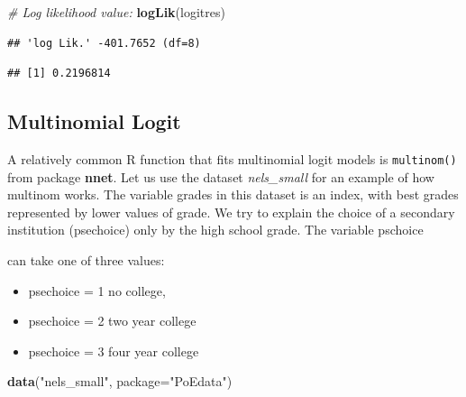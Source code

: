 \documentclass[]{book}
\newenvironment{Shaded}{\begin{snugshade}}{\end{snugshade}}
\newcommand{\CommentTok}[1]{\textcolor[rgb]{0.56,0.35,0.01}{\textit{#1}}}
\newcommand{\DataTypeTok}[1]{\textcolor[rgb]{0.13,0.29,0.53}{#1}}
\newcommand{\DecValTok}[1]{\textcolor[rgb]{0.00,0.00,0.81}{#1}}
\newcommand{\KeywordTok}[1]{\textcolor[rgb]{0.13,0.29,0.53}{\textbf{#1}}}
\newcommand{\NormalTok}[1]{#1}
\newcommand{\OperatorTok}[1]{\textcolor[rgb]{0.81,0.36,0.00}{\textbf{#1}}}
\newcommand{\StringTok}[1]{\textcolor[rgb]{0.31,0.60,0.02}{#1}}
\providecommand{\tightlist}{%
  \setlength{\itemsep}{0pt}\setlength{\parskip}{0pt}}
\begin{document}
\begin{Shaded}
\begin{Highlighting}[]
\CommentTok{# Log likelihood value:}
\KeywordTok{logLik}\NormalTok{(logitres) }
\end{Highlighting}
\end{Shaded}

\begin{verbatim}
## 'log Lik.' -401.7652 (df=8)
\end{verbatim}

\begin{Shaded}
\end{Shaded}

\begin{verbatim}
## [1] 0.2196814
\end{verbatim}

\hypertarget{multinomial-logit}{%
\subsection{Multinomial Logit}\label{multinomial-logit}}

A relatively common R function that fits multinomial logit models is
\texttt{multinom()} from package \textbf{nnet}. Let us use the dataset
\emph{nels\_small} for an example of how multinom works. The variable
grades in this dataset is an index, with best grades represented by
lower values of grade. We try to explain the choice of a secondary
institution (psechoice) only by the high school grade. The variable
pschoice

can take one of three values:

\begin{itemize}
\tightlist
\item
  psechoice = 1 no college,
\item
  psechoice = 2 two year college
\item
  psechoice = 3 four year college
\end{itemize}

\begin{Shaded}
\begin{Highlighting}[]
\KeywordTok{data}\NormalTok{(}\StringTok{"nels_small"}\NormalTok{, }\DataTypeTok{package=}\StringTok{"PoEdata"}\NormalTok{)}
\end{Highlighting}
\end{Shaded}
\end{document}
